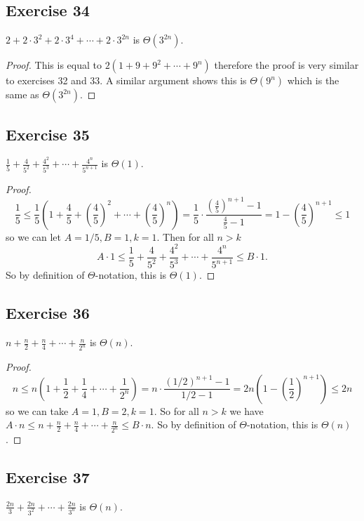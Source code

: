 \documentclass[14pt]{extarticle}
\newcommand{\dps}{\displaystyle}
\begin{document}
\subsection{Exercise 34}
\(2 + 2 \cdot 3^2 + 2 \cdot 3^4 + \cdots + 2 \cdot 3^{2n}\) is \(\Theta(3^{2n})\).

\begin{proof}
This is equal to \(2(1 + 9 + 9^2 + \cdots + 9^n)\) therefore the proof is very similar to exercises 32 and 33. A similar
argument shows this is \(\Theta(9^n)\) which is the same as \(\Theta(3^{2n})\).
\end{proof}

\subsection{Exercise 35}
\(\dps \frac{1}{5} + \frac{4}{5^2} + \frac{4^2}{5^3} + \cdots + \frac{4^n}{5^{n+1}}\) is \(\Theta(1)\).

\begin{proof}
\[
\frac{1}{5} \leq \frac{1}{5}\left(1 + \frac{4}{5}+ \left( \frac{4}{5}\right)^2 + \cdots + \left(\frac{4}{5}\right)^n 
\right) = \frac{1}{5} \cdot \frac{\left(\frac{4}{5}\right)^{n+1} - 1}{\frac{4}{5} - 1} = 1 - \left(\frac{4}{5}
\right)^{n+1} \leq 1
\]
so we can let \(A = 1/5, B = 1, k = 1\). Then for all \(n > k\)
\[
A \cdot 1 \leq \frac{1}{5} + \frac{4}{5^2} + \frac{4^2}{5^3} + \cdots + \frac{4^n}{5^{n+1}} \leq B \cdot 1.
\]
So by definition of \(\Theta\)-notation, this is \(\Theta(1)\).
\end{proof}

\subsection{Exercise 36}
\(\dps n + \frac{n}{2} + \frac{n}{4} + \cdots + \frac{n}{2^n}\) is \(\Theta(n)\).

\begin{proof}
\[
n \leq n\left(1 + \frac{1}{2} + \frac{1}{4} + \cdots + \frac{1}{2^n}\right) = n \cdot \frac{(1/2)^{n+1} - 1}{1/2 - 1} 
= 2n \left(1 - \left(\frac{1}{2}\right)^{n+1}\right) \leq 2n
\]
so we can take \(A = 1, B = 2, k = 1\). So for all \(n > k\) we have \(\dps A \cdot n \leq n + \frac{n}{2} + \frac{n}{4} + 
\cdots + \frac{n}{2^n} \leq B \cdot n\). So by definition of \(\Theta\)-notation, this is \(\Theta(n)\).
\end{proof}

\subsection{Exercise 37}
\(\dps \frac{2n}{3} + \frac{2n}{3^2} + \cdots + \frac{2n}{3^n}\) is \(\Theta(n)\).
\end{document}
